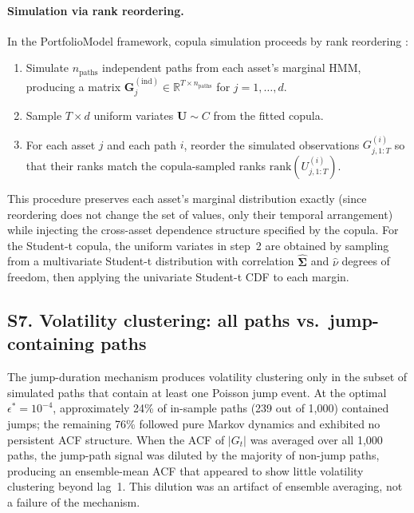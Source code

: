 \paragraph{Simulation via rank reordering.}
In the PortfolioModel framework, copula simulation proceeds by rank reordering \cite{embrechts_copulas_2002}:
\begin{enumerate}
    \item Simulate $n_{\text{paths}}$ independent paths from each asset's marginal HMM, producing a matrix $\mathbf{G}_j^{(\text{ind})} \in \mathbb{R}^{T \times n_{\text{paths}}}$ for $j = 1, \dots, d$.
    \item Sample $T \times d$ uniform variates $\mathbf{U} \sim C$ from the fitted copula.
    \item For each asset $j$ and each path $i$, reorder the simulated observations $G_{j,1:T}^{(i)}$ so that their ranks match the copula-sampled ranks $\text{rank}(U_{j,1:T}^{(i)})$.
\end{enumerate}
This procedure preserves each asset's marginal distribution exactly (since reordering does not change the set of values, only their temporal arrangement) while injecting the cross-asset dependence structure specified by the copula. For the Student-t copula, the uniform variates in step~2 are obtained by sampling from a multivariate Student-t distribution with correlation $\hat{\mathbf{\Sigma}}$ and $\hat{\nu}$ degrees of freedom, then applying the univariate Student-t CDF to each margin.

\clearpage

\subsection*{S7. Volatility clustering: all paths vs.\ jump-containing paths}
\label{sec:acf_jump}

The jump-duration mechanism produces volatility clustering only in the subset of simulated paths that contain at least one Poisson jump event. At the optimal $\epsilon^{*}=10^{-4}$, approximately 24\% of in-sample paths (239 out of 1{,}000) contained jumps; the remaining 76\% followed pure Markov dynamics and exhibited no persistent ACF structure. When the ACF of $|G_t|$ was averaged over all 1{,}000 paths, the jump-path signal was diluted by the majority of non-jump paths, producing an ensemble-mean ACF that appeared to show little volatility clustering beyond lag~1. This dilution was an artifact of ensemble averaging, not a failure of the mechanism.

